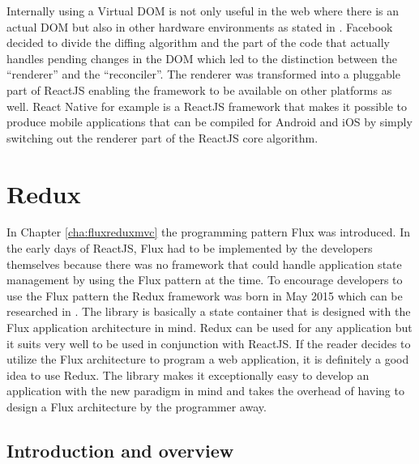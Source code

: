 Internally using a Virtual DOM is not only useful in the web where there is an actual DOM but also in other hardware environments as stated in \cite[2:10]{youtube.2017}. Facebook decided to divide the diffing algorithm and the part of the code that actually handles pending changes in the DOM which led to the distinction between the \enquote{renderer} and the \enquote{reconciler}. The renderer was transformed into a pluggable part of ReactJS enabling the framework to be available on other platforms as well. React Native for example is a ReactJS framework that makes it possible to produce mobile applications that can be compiled for Android and iOS by simply switching out the renderer part of the ReactJS core algorithm.



\section{Redux}

In Chapter \ref{cha:fluxreduxmvc} the programming pattern Flux was introduced. In the early days of ReactJS, Flux had to be implemented by the developers themselves because there was no framework that could handle application state management by using the Flux pattern at the time. To encourage developers to use the Flux pattern the Redux framework was born in May 2015 which can be researched in \cite{DanAbramov.2015}. The library is basically a state container that is designed with the Flux application architecture in mind. Redux can be used for any application but it suits very well to be used in conjunction with ReactJS. If the reader decides to utilize the Flux architecture to program a web application, it is definitely a good idea to use Redux. The library makes it exceptionally easy to develop an application with the new paradigm in mind and takes the overhead of having to design a Flux architecture by the programmer away.


\subsection{Introduction and overview} \label{ssec:introductionoverview}

